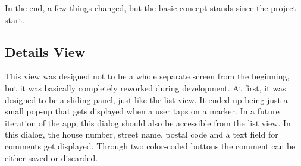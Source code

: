 In the end, a few things changed, but the basic concept stands since the project start.

\subsection{Details View}
This view was designed not to be a whole separate screen from the beginning, but it was basically completely reworked during development. At first, it was designed to be a sliding panel, just like the list view. It ended up being just a small pop-up that gets displayed when a user taps on a marker. In a future iteration of the app, this dialog should also be accessible from the list view. In this dialog, the house number, street name, postal code and a text field for comments get displayed. Through two color-coded buttons the comment can be either saved or discarded.


